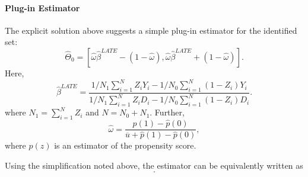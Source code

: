 \documentclass[11pt,a4paper,english]{article} %
\numberwithin{equation}{section}
\numberwithin{figure}{section}
\numberwithin{table}{section}
\theoremstyle{definition}
\theoremstyle{remark}
\begin{document}
\paragraph{Plug-in Estimator}
The explicit solution above suggests a simple plug-in estimator for the identified set:
\begin{equation}
	\hat{\Theta}_0 = \left[\hat{\omega} \hat{\beta}^{LATE} - (1-\hat{\omega}), \hat{\omega}\hat{\beta}^{LATE} + (1-\hat{\omega}) \right].
\end{equation}
Here,
\begin{equation}
	\hat{\beta}^{LATE}  = \frac{1/N_1 \sum_{i=1}^N Z_i Y_i - 1/N_0 \sum_{i=1}^N(1-Z_i)Y_i}{1/N_1\sum_{i=1}^N Z_i D_i - 1/N_0\sum_{i=1}^N (1-Z_i)D_i}.
\end{equation}
where $N_1 = \sum_{i=1}^N Z_i$ and $N = N_0 + N_1$. Further,
\begin{equation}
	\hat{\omega} = \frac{\hat{p}(1) - \hat{p}(0)}{\overline{u} + \hat{p}(1) - \hat{p}(0)},
\end{equation}
where $\hat{p}(z)$ is an estimator of the propensity score.

Using the simplification noted above, the estimator can be equivalently written as
\begin{equation}
	.
\end{equation}




\end{document}
